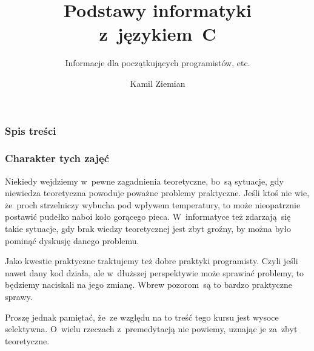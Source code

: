 \documentclass[10pt,t]{beamer}
\title{Podstawy informatyki z~językiem~C}
\subtitle{Informacje dla początkujących programistów, etc.}
\author{Kamil Ziemian \\
  \email}
\begin{document}





\RaggedRight





\maketitle





\begin{frame}
  \frametitle{Spis treści}


  \tableofcontents

\end{frame}





\begin{frame}
  \frametitle{Charakter tych zajęć}


  Niekiedy wejdziemy w~pewne zagadnienia teoretyczne, bo~są sytuacje, gdy
  niewiedza teoretyczna powoduje poważne problemy praktyczne. Jeśli ktoś
  nie wie, że~proch strzelniczy wybucha pod wpływem temperatury, to może
  nieopatrznie postawić pudełko naboi koło gorącego pieca. W~informatyce
  też zdarzają~się takie sytuacje, gdy brak wiedzy teoretycznej jest zbyt
  groźny, by można było pominąć dyskusję danego problemu.

  Jako kwestie praktyczne traktujemy też dobre praktyki programisty.
  Czyli jeśli nawet dany kod działa, ale w~dłuższej perspektywie może
  sprawiać problemy, to będziemy naciskali na jego zmianę. Wbrew
  pozorom~są to bardzo praktyczne sprawy.

  Proszę jednak pamiętać, że~ze względu na to treść tego kursu jest wysoce
  selektywna. O~wielu rzeczach z~premedytacją nie powiemy, uznając je
  za~zbyt teoretyczne.

\end{frame}
\end{document}
